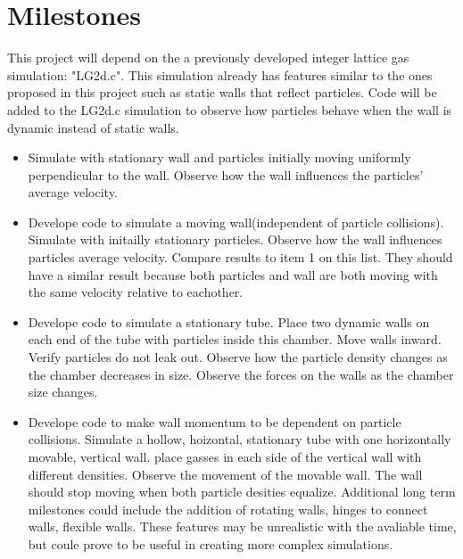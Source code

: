\documentclass{article}
\begin{document}
\section{Milestones}
This project will depend on the a previously developed integer lattice gas simulation: "LG2d.c". This simulation already has features similar to the ones proposed in this project such as static walls that reflect particles. Code will be added to the LG2d.c simulation to observe how particles behave when the wall is dynamic instead of static walls. 
\begin{itemize}
  \item Simulate with stationary wall and particles initially moving uniformly perpendicular to the wall. Observe how the wall influences the particles' average velocity.  
  \item Develope code to simulate a moving wall(independent of particle collisions). Simulate with initailly stationary particles. Observe how the wall influences particles average velocity. Compare results to item 1 on this list. They should have a similar result because both particles and wall are both moving with the same velocity relative to eachother.
  \item Develope code to simulate a stationary tube. Place two dynamic walls on each end of the tube with particles inside this chamber. Move walls inward. Verify particles do not leak out. Observe how the particle density changes as the chamber decreases in size. Observe the forces on the walls as the chamber size changes.
  \item Develope code to make wall momentum to be dependent on particle collisions. Simulate a hollow, hoizontal, stationary tube with one horizontally movable, vertical wall. place gasses in each side of the vertical wall with different densities. Observe the movement of the movable wall. The wall should stop moving when both particle desities equalize.\newline
\vspace{5mm}\newline
Additional long term milestones could include the addition of rotating walls, hinges to connect walls, flexible walls. These features may be unrealistic with the avaliable time, but coule prove to be useful in creating more complex simulations.
\end{itemize}
\end{document}
